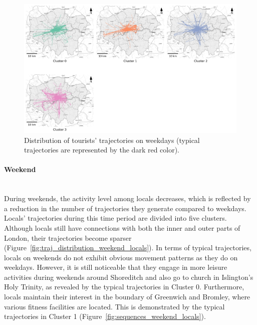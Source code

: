 \documentclass{article}
\newcommand{\subsubsubsection}[1]{\paragraph{#1}\mbox{}\\}
\theoremstyle{remark}
\begin{document}
\begin{figure}[!h]
\centering
\includegraphics[width=1\textwidth]{figures/traj_distribution_weekday_tourists.png}
\caption{\label{fig:traj_distribution_weekday_tourists}Distribution of tourists' trajectories on weekdays (typical trajectories are represented by the dark red color).}
\end{figure}

\subsubsubsection{Weekend}

During weekends, the activity level among locals decreases, which is reflected by a reduction in the number of trajectories they generate compared to weekdays. Locals' trajectories during this time period are divided into five clusters. Although locals still have connections with both the inner and outer parts of London, their trajectories become sparser (Figure~\ref{fig:traj_distribution_weekend_locals}). In terms of typical trajectories, locals on weekends do not exhibit obvious movement patterns as they do on weekdays. However, it is still noticeable that they engage in more leisure activities during weekends around Shoreditch and also go to church in Islington's Holy Trinity, as revealed by the typical trajectories in Cluster 0. Furthermore, locals maintain their interest in the boundary of Greenwich and Bromley, where various fitness facilities are located. This is demonstrated by the typical trajectories in Cluster 1 (Figure~\ref{fig:sequences_weekend_locals}).
\end{document}
